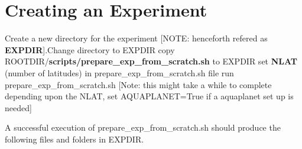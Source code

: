 \documentclass{article}
\begin{document}
\section{Creating an Experiment}
Create a new directory for the experiment [NOTE: henceforth refered as \textbf{EXPDIR}].\newline Change directory to EXPDIR \newline
copy ROOTDIR/\textbf{scripts/prepare\_exp\_from\_scratch.sh} to EXPDIR \newline
set \textbf{NLAT} (number of latitudes) in prepare\_exp\_from\_scratch.sh file\newline
run prepare\_exp\_from\_scratch.sh [Note: this might take a while to complete depending upon the NLAT, set AQUAPLANET=True if a aquaplanet set up is needed]\newline

A successful execution of prepare\_exp\_from\_scratch.sh should produce the following files and folders in EXPDIR.
\end{document}
